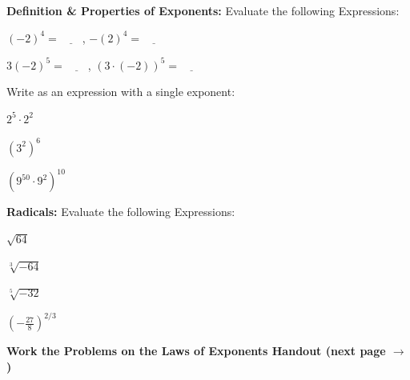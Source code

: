 \documentclass[10pt]{article}
\begin{document}
\begin{list}{\bf{Problem . }}{}
\hspace*{-.5in} \textbf{Definition \& Properties of Exponents:} Evaluate the following Expressions: 
 

\item $(-2)^4 = \underline{\qquad}$, \hspace*{.5in} $-(2)^4 = \underline{\qquad}$
\vfill
\item $3(-2)^5 = \underline{\qquad}$, \hspace*{.5in} $(3\cdot (-2))^5 = \underline{\qquad}$

\vfill

\hspace*{-.5in} Write as an expression with a single exponent:
\item $2^5 \cdot 2^2$
\vfill
\item $(3^2)^6$
\vfill
\item $(9^{50} \cdot 9^2)^{10}$

\vfill

\hspace*{-.5in}\textbf{Radicals:} Evaluate the following Expressions:

\item $\sqrt{64}$
\vfill
\item $\sqrt[3]{-64}$
\vfill
\item $\sqrt[5]{-32}$
\vfill
\item $\left(-\frac{27}{8}\right)^{2/3}$

\vfill
\end{list}

\textbf{Work the Problems on the Laws of Exponents Handout (next page $\rightarrow$)}\\
%

\pagebreak
\end{document}

